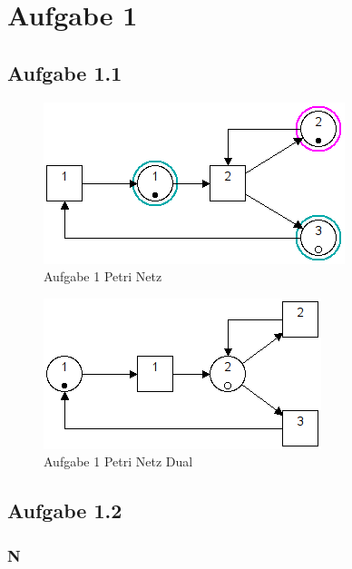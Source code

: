 \documentclass[10pt]{scrartcl}
\author{André Harms, Oliver Steenbuck}
\title{\titletext}
\date{24.05.2012}
\begin{document}
\maketitle

\setcounter{tocdepth}{3}
\tableofcontents

	\listoffigures  

\section{Aufgabe 1}
	\subsection{Aufgabe 1.1}
			\begin{figure}[H]
    			\centering
				\includegraphics[scale=0.5]{aufg1.png}		
            	\caption{Aufgabe 1 Petri Netz}
            	\label{petri:aufg1}
			\end{figure}


			\begin{figure}[H]
    			\centering
				\includegraphics[scale=0.5]{aufg1Dual.png}		
            	\caption{Aufgabe 1 Petri Netz Dual}
            	\label{petri:aufg1:dual}
			\end{figure}
			
	\subsection{Aufgabe 1.2}
		\subsubsection{N}
		
\end{document}
